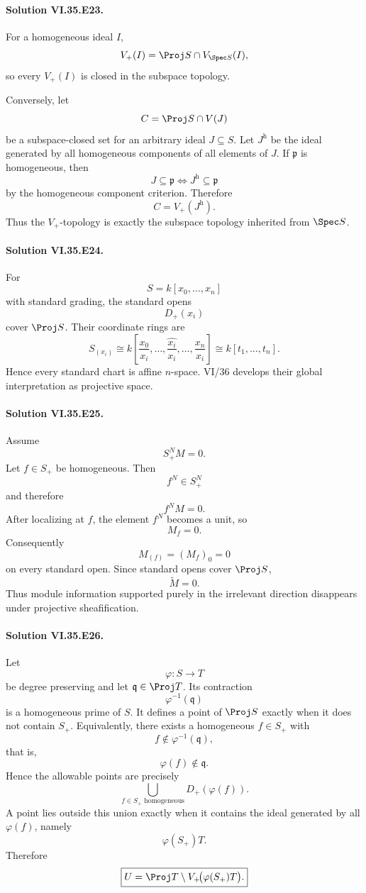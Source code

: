 \paragraph{Solution VI.35.E23.}
For a homogeneous ideal \(I\),
\[
V_+(I)=\Proj S\cap V_{\Spec S}(I),
\]
so every \(V_+(I)\) is closed in the subspace topology.

Conversely, let
\[
C=\Proj S\cap V(J)
\]
be a subspace-closed set for an arbitrary ideal \(J\subseteq S\). Let \(J^{\mathrm h}\) be the ideal generated by
all homogeneous components of all elements of \(J\). If \(\mathfrak p\) is homogeneous, then
\[
J\subseteq\mathfrak p
\iff
J^{\mathrm h}\subseteq\mathfrak p
\]
by the homogeneous component criterion. Therefore
\[
C=V_+(J^{\mathrm h}).
\]
Thus the \(V_+\)-topology is exactly the subspace topology inherited from \(\Spec S\).

\paragraph{Solution VI.35.E24.}
For
\[
S=k[x_0,\ldots,x_n]
\]
with standard grading, the standard opens
\[
D_+(x_i)
\]
cover \(\Proj S\). Their coordinate rings are
\[
S_{(x_i)}
\cong
k\!\left[
\frac{x_0}{x_i},\ldots,
\widehat{\frac{x_i}{x_i}},
\ldots,\frac{x_n}{x_i}
\right]
\cong
k[t_1,\ldots,t_n].
\]
Hence every standard chart is affine \(n\)-space. VI/36 develops their global interpretation as projective space.

\paragraph{Solution VI.35.E25.}
Assume
\[
S_+^NM=0.
\]
Let \(f\in S_+\) be homogeneous. Then
\[
f^N\in S_+^N
\]
and therefore
\[
f^NM=0.
\]
After localizing at \(f\), the element \(f^N\) becomes a unit, so
\[
M_f=0.
\]
Consequently
\[
M_{(f)}=(M_f)_0=0
\]
on every standard open. Since standard opens cover \(\Proj S\),
\[
\boxed{\widetilde M=0}.
\]
Thus module information supported purely in the irrelevant direction disappears under projective sheafification.

\paragraph{Solution VI.35.E26.}
Let
\[
\varphi:S\to T
\]
be degree preserving and let \(\mathfrak q\in\Proj T\). Its contraction
\[
\varphi^{-1}(\mathfrak q)
\]
is a homogeneous prime of \(S\). It defines a point of \(\Proj S\) exactly when it does not contain \(S_+\).
Equivalently, there exists a homogeneous \(f\in S_+\) with
\[
f\notin\varphi^{-1}(\mathfrak q),
\]
that is,
\[
\varphi(f)\notin\mathfrak q.
\]
Hence the allowable points are precisely
\[
\bigcup_{f\in S_+\text{ homogeneous}}D_+(\varphi(f)).
\]
A point lies outside this union exactly when it contains the ideal generated by all \(\varphi(f)\), namely
\[
\varphi(S_+)T.
\]
Therefore
\[
\boxed{
U
=
\Proj T\setminus V_+\!\bigl(\varphi(S_+)T\bigr).
}
\]
